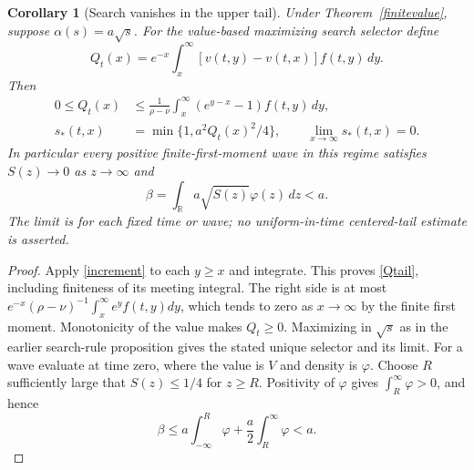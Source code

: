 \documentclass[11pt]{article}
\newtheorem{corollary}[theorem]{Corollary}
\newcommand{\R}{\mathbb R}
\begin{document}
\begin{corollary}[Search vanishes in the upper tail]\label{vanishingsearch}
Under Theorem~\ref{finitevalue}, suppose $\alpha(s)=a\sqrt{s}$.
For the value-based maximizing search selector define
\[
 Q_t(x)=e^{-x}\int_x^\infty[v(t,y)-v(t,x)]f(t,y)\,dy.
\]
Then
\begin{align}
 0\leq Q_t(x)&\leq\frac1{\rho-\nu}
       \int_x^\infty(e^{y-x}-1)f(t,y)\,dy,\label{Qtail}\\
 s_*(t,x)&=\min\{1,a^2Q_t(x)^2/4\},\qquad
           \lim_{x\to\infty}s_*(t,x)=0.\nonumber
\end{align}
In particular every positive finite-first-moment wave in this regime
satisfies $S(z)\to0$ as $z\to\infty$ and
\[
 \beta=\int_\R a\sqrt{S(z)}\varphi(z)\,dz<a.
\]
The limit is for each fixed time or wave; no uniform-in-time centered-tail
estimate is asserted.
\end{corollary}
\begin{proof}
Apply \eqref{increment} to each $y\geq x$ and integrate. This proves
\eqref{Qtail}, including finiteness of its meeting integral. The right
side is at most
$e^{-x}(\rho-\nu)^{-1}\int_x^\infty e^yf(t,y)dy$, which tends to zero
as $x\to\infty$ by the finite first moment. Monotonicity of the value
makes $Q_t\geq0$. Maximizing in $\sqrt{s}$ as in the earlier search-rule
proposition gives the stated unique selector and its limit.
For a wave evaluate at time zero, where the value is $V$ and density is
$\varphi$. Choose $R$ sufficiently large that $S(z)\leq1/4$ for
$z\geq R$. Positivity of $\varphi$ gives
$\int_R^\infty\varphi>0$, and hence
\[
 \beta\leq a\int_{-\infty}^R\varphi
           +\frac a2\int_R^\infty\varphi<a.
\]
\end{proof}
\end{document}
